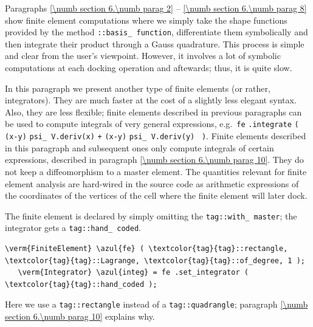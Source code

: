 Paragraphs \ref{\numb section 6.\numb parag 2} -- \ref{\numb section 6.\numb parag 8}
show finite element computations where we simply take the shape functions provided by
the method {\small\tt{}::basis\_\,function}, differentiate them
symbolically and then integrate their product through a Gauss quadrature.
This process is simple and clear from the user's viewpoint.
However, it involves a lot of symbolic computations at each docking operation and aftewards;
thus, it is quite slow.

In this paragraph we present another type of finite elements (or rather, integrators).
They are much faster at the cost of a slightly less elegant syntax.
Also, they are less flexible; finite elements described in previous paragraphs can be used
to compute integrals of very general expressions, e.g.\ {\small\tt fe} {\small\tt .integrate}
{\small\tt(} {\small\tt{}} {\small\tt(x-y)} {\small\tt *} {\small\tt psi\_\,V.deriv(x)}
{\small\tt +} {\small\tt{}} {\small\tt(x-y)} {\small\tt *} {\small\tt psi\_\,V.deriv(y)}%
~{\small\tt )}.
Finite elements described in this paragraph and subsequent ones only compute integrals
of certain expressions, described in paragraph \ref{\numb section 6.\numb parag 10}.
They do not keep a diffeomorphism to a master element.
The quantities relevant for finite element analysis are hard-wired in the source code
as arithmetic expressions
of the coordinates of the vertices of the cell where the finite element will later dock.

The finite element is declared by simply omitting the
{\small\tt\textcolor{tag}{tag}::with\_\,master}; the integrator gets a
{\small\tt\textcolor{tag}{tag}::hand\_\,coded}.

\begin{Verbatim}[commandchars=\\\{\},formatcom=\small\tt,frame=single,
   label=parag-\ref{\numb section 6.\numb parag 9}.cpp,rulecolor=\color{coment},
   baselinestretch=0.94,framesep=2mm                                            ]
   \verm{FiniteElement} \azul{fe} ( \textcolor{tag}{tag}::rectangle, \textcolor{tag}{tag}::Lagrange, \textcolor{tag}{tag}::of_degree, 1 );
   \verm{Integrator} \azul{integ} = fe .set_integrator ( \textcolor{tag}{tag}::hand_coded );
\end{Verbatim}

Here we use a {\small\tt\textcolor{tag}{tag}::rectangle} instead of
a {\small\tt\textcolor{tag}{tag}::quadrangle};
paragraph \ref{\numb section 6.\numb parag 10} explains why.

